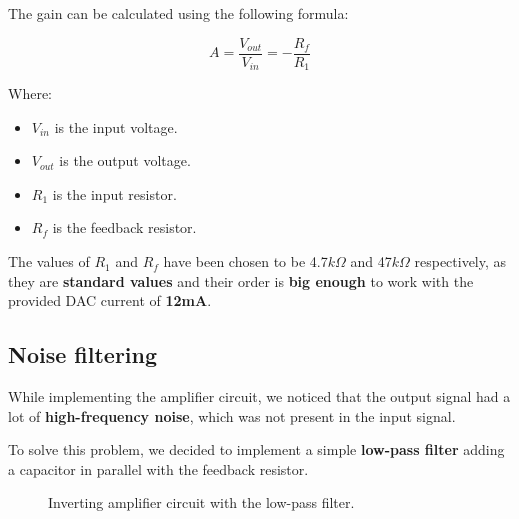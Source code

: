 \begin{samepage}
    The gain can be calculated using the following formula:
    \nopagebreak

    \begin{equation*}
        A = \frac{V_{out}}{V_{in}} = -\frac{R_f}{R_1}
    \end{equation*}
    \nopagebreak

    Where:
    \nopagebreak

    \begin{itemize}
        \item $V_{in}$ is the input voltage.
        \item $V_{out}$ is the output voltage.
        \item $R_1$ is the input resistor.
        \item $R_f$ is the feedback resistor.
    \end{itemize}
\end{samepage}

The values of $R_1$ and $R_f$ have been chosen to be 4.7$k\Omega$ and 47$k\Omega$ respectively, as they are \textbf{standard values} and their order is \textbf{big enough} to work with the provided DAC current of \textbf{12mA}.

\pagebreak
\subsection{Noise filtering}
While implementing the amplifier circuit, we noticed that the output signal had a lot of \textbf{high-frequency noise}, which was not present in the input signal.

\begin{samepage}
    To solve this problem, we decided to implement a simple \textbf{low-pass filter} adding a capacitor in parallel with the feedback resistor.
    \nopagebreak

    \begin{figure}[H]
        \centering
        \resizebox{.6\linewidth}{!}{
            
        }
        \caption{Inverting amplifier circuit with the low-pass filter.}
        \label{fig:non-inv_ampl_filter}
    \end{figure}
\end{samepage}


